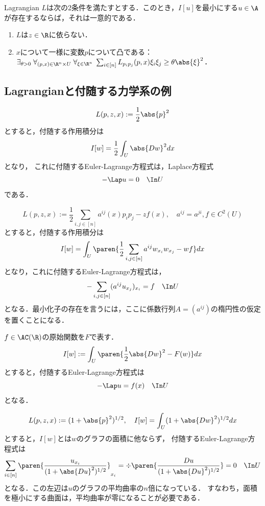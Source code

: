 \documentclass[uplatex,dvipdfmx]{jsreport}
\begin{document}
\begin{theorem}
    Lagrangian $L$は次の2条件を満たすとする．このとき，$I[u]$を最小にする$u\in\A$が存在するならば，それは一意的である．
    \begin{enumerate}
        \item $L$は$z\in\R$に依らない．
        \item $x$について一様に変数$p$について凸である：$\exists_{\theta>0}\;\forall_{(p,x)\in\R^n\times U}\;\forall_{\xi\in\R^n}\;\sum_{i\in[n]}L_{p_ip_j}(p,x)\xi_i\xi_j\ge\theta\abs{\xi}^2$．
    \end{enumerate}
\end{theorem}

\subsection{Lagrangianと付随する力学系の例}

\begin{example}[Laplace方程式とDirichletの原理]
    \[L(p,z,x):=\frac{1}{2}\abs{p}^2\]
    とすると，付随する作用積分は
    \[I[w]=\frac{1}{2}\int_U\abs{Dw}^2dx\]
    となり，
    これに付随するEuler-Lagrange方程式は，Laplace方程式
    \[-\Lap u=0\quad\In U\]
    である．
\end{example}

\begin{example}[一般化Dirichletの原理]
    \[L(p,z,x):=\frac{1}{2}\sum_{i,j\in[n]}a^{ij}(x)p_ip_j-zf(x),\quad a^{ij}=a^{ji},f\in C^2(U)\]
    とすると，付随する作用積分は
    \[I[w]=\int_U\paren{\frac{1}{2}\sum_{i,j\in[n]}a^{ij}w_{x_i}w_{x_j}-wf}dx\]
    となり，これに付随するEuler-Lagrange方程式は，
    \[-\sum_{i,j\in[n]}(a^{ij}u_{x_j})_{x_i}=f\quad\In U\]
    となる．最小化子の存在を言うには，ここに係数行列$A=(a^{ij})$の楕円性の仮定を置くことになる．
\end{example}

\begin{example}[Poisson方程式]
    $f\in\AC(\R)$の原始関数を$F$で表す．
    \[I[w]:=\int_U\paren{\frac{1}{2}\abs{Dw}^2-F(w)}dx\]
    とすると，付随するEuler-Lagrange方程式は
    \[-\Lap u=f(x)\quad\In U\]
    となる．
\end{example}

\begin{example}[極小曲面]
    \[L(p,z,x):=(1+\abs{p}^2)^{1/2},\quad I[w]=\int_U(1+\abs{Dw}^2)^{1/2}dx\]
    とすると，$I[w]$とは$w$のグラフの面積に他ならず，
    付随するEuler-Lagrange方程式は
    \[\sum_{i\in[n]}\paren{\frac{u_{x_i}}{(1+\abs{Du}^2)^{1/2}}}_{x_i}=\div\paren{\frac{Du}{(1+\abs{Du}^2)^{1/2}}}=0\quad\In U\]
    となる．この左辺は$u$のグラフの平均曲率の$n$倍になっている．
    すなわち，面積を極小にする曲面は，平均曲率が零になることが必要である．
\end{example}
\end{document}
